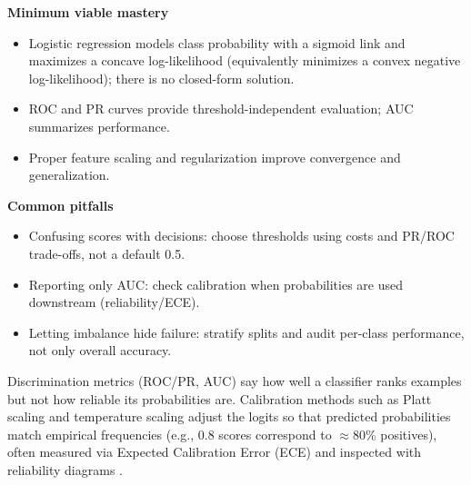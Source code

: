 \FloatBarrier
\begin{tcolorbox}[summarybox, title={Key takeaways}]
\textbf{Minimum viable mastery}
\begin{itemize}
    \item Logistic regression models class probability with a sigmoid link and maximizes a concave log\hyp{}likelihood (equivalently minimizes a convex negative log\hyp{}likelihood); there is no closed-form solution.
    \item ROC and PR curves provide threshold\hyp{}independent evaluation; AUC summarizes performance.
    \item Proper feature scaling and regularization improve convergence and generalization.
\end{itemize}
\medskip
\textbf{Common pitfalls}
\begin{itemize}
    \item Confusing scores with decisions: choose thresholds using costs and PR/ROC trade-offs, not a default 0.5.
    \item Reporting only AUC: check calibration when probabilities are used downstream (reliability/ECE).
    \item Letting imbalance hide failure: stratify splits and audit per-class performance, not only overall accuracy.
\end{itemize}
\end{tcolorbox}

\begin{tcolorbox}[summarybox, title={Probability calibration}]
Discrimination metrics (ROC/PR, AUC) say how well a classifier ranks examples but not how reliable its probabilities are. Calibration methods such as Platt scaling and temperature scaling adjust the logits so that predicted probabilities match empirical frequencies (e.g., 0.8 scores correspond to \(\approx 80\%\) positives), often measured via Expected Calibration Error (ECE) and inspected with reliability diagrams \citep{Platt1999,Guo2017}.
\end{tcolorbox}

